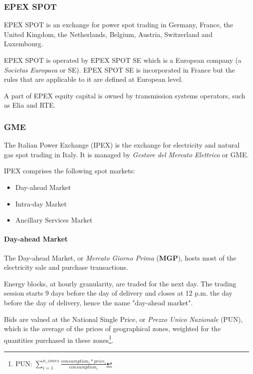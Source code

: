\subsubsection{EPEX SPOT} \label{section:providers:epex}
    EPEX SPOT is an exchange for power spot trading in Germany, France, the United Kingdom, the Netherlands, Belgium, Austria, Switzerland and Luxembourg.\cite{bib:wikipedia:epex_spot}
    
    EPEX SPOT is operated by EPEX SPOT SE which is a European company (a \textit{Societas Europaea} or SE).
    EPEX SPOT SE is incorporated in France but the rules that are applicable to it are defined at European level.
    
    A part of EPEX equity capital is owned by transmission systems operators, such as Elia and RTE.\cite{bib:epex:desc}

\subsubsection{GME} \label{section:providers:gme}
    The Italian Power Exchange (IPEX) is the exchange for electricity and natural gas spot trading in Italy.
    It is managed by \textit{Gestore del Mercato Elettrico} or GME.\cite{bib:gme:mpe}

    IPEX comprises the following spot markets:
        \begin{itemize}
            \item Day-ahead Market
            \item Intra-day Market
            \item Ancillary Services Market
        \end{itemize}
        
    \paragraph{Day-ahead Market}
        The Day-ahead Market, or \textit{Mercato Giorno Prima} (\textbf{MGP}), hosts most of the electricity sale and purchase transactions.
        
        Energy blocks, at hourly granularity, are traded for the next day.
        The trading session starts 9 days before the day of delivery and closes at 12 p.m. the day before the day of delivery, hence the name "day-ahead market".
        
        Bids are valued at the National Single Price, or \textit{Prezzo Unico Nazionale} (PUN), which is the average of the prices of geographical zones, weighted for the quantities purchased in these zones\footnote{PUN: $\sum_{i=1}^{n\_zones} \frac{consumption_i * price_i}{consumption_i}$}.
        
